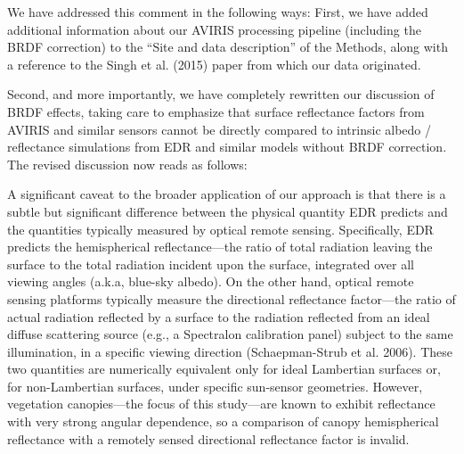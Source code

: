 We have addressed this comment in the following ways: First, we have added additional information about our AVIRIS processing pipeline (including the BRDF correction) to the “Site and data description” of the Methods, along with a reference to the Singh et al. (2015) paper from which our data originated.

Second, and more importantly, we have completely rewritten our discussion of BRDF effects, taking care to emphasize that surface reflectance factors from AVIRIS and similar sensors cannot be directly compared to intrinsic albedo / reflectance simulations from EDR and similar models without BRDF correction. The revised discussion now reads as follows:

A significant caveat to the broader application of our approach is that there is a subtle but significant difference between the physical quantity EDR predicts and the quantities typically measured by optical remote sensing. Specifically, EDR predicts the hemispherical reflectance---the ratio of total radiation leaving the surface to the total radiation incident upon the surface, integrated over all viewing angles (a.k.a, blue-sky albedo). On the other hand, optical remote sensing platforms typically measure the directional reflectance factor---the ratio of actual radiation reflected by a surface to the radiation reflected from an ideal diffuse scattering source (e.g., a Spectralon calibration panel) subject to the same illumination, in a specific viewing direction (Schaepman-Strub et al. 2006). These two quantities are numerically equivalent only for ideal Lambertian surfaces or, for non-Lambertian surfaces, under specific sun-sensor geometries. However, vegetation canopies---the focus of this study---are known to exhibit reflectance with very strong angular dependence, so a comparison of canopy hemispherical reflectance with a remotely sensed directional reflectance factor is invalid.

